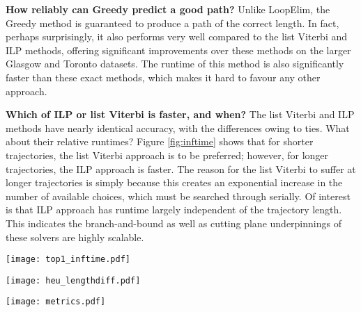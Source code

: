 \textbf{How reliably can {\sc Greedy} predict a good path?}
Unlike {\sc LoopElim}, the {\sc Greedy} method is guaranteed to produce a path of the correct length.
In fact, perhaps surprisingly, it also performs very well compared to the list Viterbi and ILP methods, 
offering significant improvements over these methods on the larger Glasgow and Toronto datasets.
The runtime of this method is also significantly faster than these exact methods,
which makes it hard to favour any other approach.

\textbf{Which of ILP or list Viterbi is faster, and when?}
The list Viterbi and ILP methods have nearly identical accuracy, with the differences owing to ties.
What about their relative runtimes?
Figure \ref{fig:inftime} shows that for shorter trajectories, the list Viterbi approach is to be preferred;
however, for longer trajectories, the ILP approach is faster.
The reason for the list Viterbi to suffer at longer trajectories is simply because this creates an exponential increase in the number of available choices, which must be searched through serially.
Of interest is that ILP approach has runtime largely independent of the trajectory length.
This indicates the branch-and-bound as well as cutting plane underpinnings of these solvers are highly scalable.




\begin{figure*}[!t]
		\centering
		\texttt{[image: top1\_inftime.pdf]}
	    \label{fig:inftime}
\end{figure*}%
\begin{figure*}[!t]
		\quad
		\centering
		\texttt{[image: heu\_lengthdiff.pdf]}
	    \label{fig:length-christo}
\end{figure*}%
\begin{figure*}[!t]
		\quad
		\centering
		\texttt{[image: metrics.pdf]}
	    \label{fig:acc-vs-length}
\end{figure*}%
